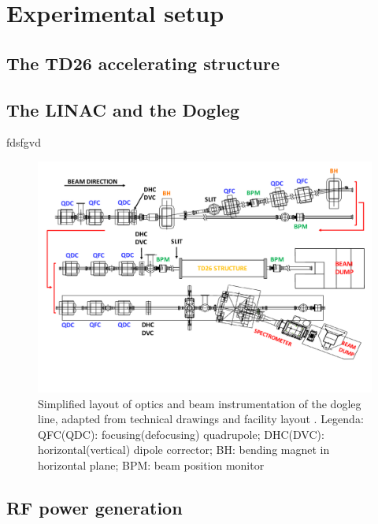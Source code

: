 \chapter[Experimental setup]{Experimental setup}

\section[Main beam accelerating structure]{The TD26 accelerating structure}

\section[Linac and dogleg]{The LINAC and the Dogleg}
fdsfgvd


\begin{landscape}
\begin{figure}
\centering 
\includegraphics[scale=0.78]{pictures/modified_pets.pdf}
\caption{Simplified layout of optics and beam instrumentation of the dogleg line, adapted from technical drawings and facility layout \cite{EDMS:CTF3}. Legenda: QFC(QDC): focusing(defocusing) quadrupole; DHC(DVC): horizontal(vertical) dipole corrector; BH: bending magnet in horizontal plane; BPM: beam position monitor}
\label{dolaut}
\end{figure}
\end{landscape}


\section[RF power generation]{RF power generation}



